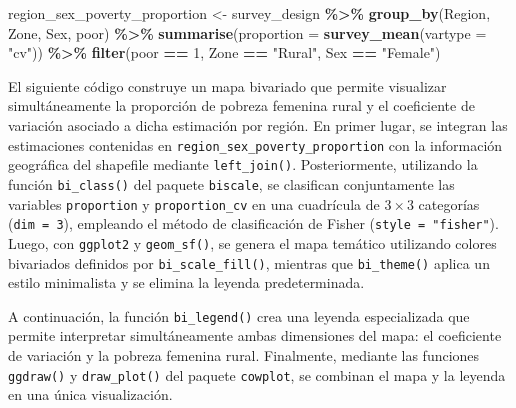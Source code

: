 \documentclass[
  spanish,
  12pt,
]{book}
\newenvironment{Shaded}{\begin{snugshade}}{\end{snugshade}}
\newcommand{\AttributeTok}[1]{\textcolor[rgb]{0.13,0.29,0.53}{#1}}
\newcommand{\DecValTok}[1]{\textcolor[rgb]{0.00,0.00,0.81}{#1}}
\newcommand{\FunctionTok}[1]{\textcolor[rgb]{0.13,0.29,0.53}{\textbf{#1}}}
\newcommand{\NormalTok}[1]{#1}
\newcommand{\OtherTok}[1]{\textcolor[rgb]{0.56,0.35,0.01}{#1}}
\newcommand{\SpecialCharTok}[1]{\textcolor[rgb]{0.81,0.36,0.00}{\textbf{#1}}}
\newcommand{\StringTok}[1]{\textcolor[rgb]{0.31,0.60,0.02}{#1}}
\begin{document}
\begin{Shaded}
\begin{Highlighting}[]
\NormalTok{region\_sex\_poverty\_proportion }\OtherTok{\textless{}{-}}\NormalTok{ survey\_design }\SpecialCharTok{\%\textgreater{}\%}
  \FunctionTok{group\_by}\NormalTok{(Region, Zone, Sex, poor) }\SpecialCharTok{\%\textgreater{}\%}
  \FunctionTok{summarise}\NormalTok{(}\AttributeTok{proportion =} \FunctionTok{survey\_mean}\NormalTok{(}\AttributeTok{vartype =} \StringTok{"cv"}\NormalTok{)) }\SpecialCharTok{\%\textgreater{}\%}
  \FunctionTok{filter}\NormalTok{(poor }\SpecialCharTok{==} \DecValTok{1}\NormalTok{, Zone }\SpecialCharTok{==} \StringTok{"Rural"}\NormalTok{, Sex }\SpecialCharTok{==} \StringTok{"Female"}\NormalTok{)}
\end{Highlighting}
\end{Shaded}

El siguiente código construye un mapa bivariado que permite visualizar simultáneamente la proporción de pobreza femenina rural y el coeficiente de variación asociado a dicha estimación por región. En primer lugar, se integran las estimaciones contenidas en \texttt{region\_sex\_poverty\_proportion} con la información geográfica del shapefile mediante \texttt{left\_join()}. Posteriormente, utilizando la función \texttt{bi\_class()} del paquete \texttt{biscale}, se clasifican conjuntamente las variables \texttt{proportion} y \texttt{proportion\_cv} en una cuadrícula de \(3 \times 3\) categorías (\texttt{dim\ =\ 3}), empleando el método de clasificación de Fisher (\texttt{style\ =\ "fisher"}). Luego, con \texttt{ggplot2} y \texttt{geom\_sf()}, se genera el mapa temático utilizando colores bivariados definidos por \texttt{bi\_scale\_fill()}, mientras que \texttt{bi\_theme()} aplica un estilo minimalista y se elimina la leyenda predeterminada.

A continuación, la función \texttt{bi\_legend()} crea una leyenda especializada que permite interpretar simultáneamente ambas dimensiones del mapa: el coeficiente de variación y la pobreza femenina rural. Finalmente, mediante las funciones \texttt{ggdraw()} y \texttt{draw\_plot()} del paquete \texttt{cowplot}, se combinan el mapa y la leyenda en una única visualización.
\end{document}
